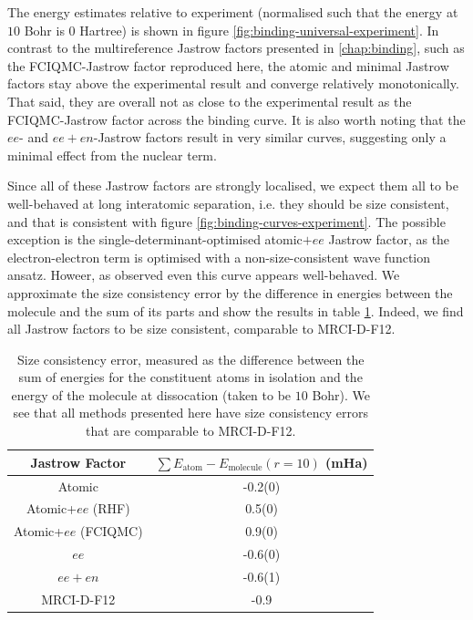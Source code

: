 The energy estimates relative to experiment (normalised such that the energy at $10$ Bohr is $0$ Hartree) is shown in figure \ref{fig:binding-universal-experiment}. In contrast to the multireference Jastrow factors presented in \autoref{chap:binding}, such as the FCIQMC-Jastrow factor reproduced here, the atomic and minimal Jastrow factors stay above the experimental result and converge relatively monotonically. That said, they are overall not as close to the experimental result as the FCIQMC-Jastrow factor across the binding curve. It is also worth noting that the $ee$- and $ee+en$-Jastrow factors result in very similar curves, suggesting only a minimal effect from the nuclear term.

Since all of these Jastrow factors are strongly localised, we expect them all to be well-behaved at long interatomic separation, i.e. they should be size consistent, and that is consistent with figure \ref{fig:binding-curves-experiment}. The possible exception is the single-determinant-optimised atomic$+ee$ Jastrow factor, as the electron-electron term is optimised with a non-size-consistent wave function ansatz. Howeer, as observed even this curve appears well-behaved. We approximate the size consistency error by the difference in energies between the molecule and the sum of its parts and show the results in table \ref{tbl:size-consistency-uni}. Indeed, we find all Jastrow factors to be size consistent, comparable to MRCI-D-F12.

\begin{table}[htbp]
    \centering
    \begin{tabular}{c|c}
        Jastrow Factor & $\sum E_\mathrm{atom} - E_\mathrm{molecule}(r=10)$ (mHa) \\
        \hline
        Atomic & -0.2(0) \\
        Atomic+$ee$ (RHF) & 0.5(0) \\
        Atomic+$ee$ (FCIQMC) & 0.9(0)\\
        $ee$ & -0.6(0) \\
        $ee+en$ & -0.6(1) \\
        \bottomrule
        MRCI-D-F12 & -0.9
    \end{tabular}
    \caption{
        Size consistency error, measured as the difference between the sum of energies for the constituent atoms in isolation and the energy of the molecule at dissocation (taken to be $10$ Bohr). We see that all methods presented here have size consistency errors that are comparable to MRCI-D-F12.
    }
    \label{tbl:size-consistency-uni}
\end{table}

